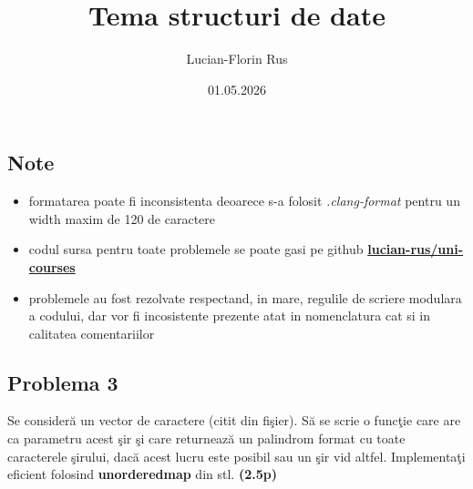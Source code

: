 \documentclass[12pt]{article}
\title{Tema structuri de date}
\author{Lucian-Florin Rus}
\date{01.05.2026}
\begin{document}
\maketitle

\renewcommand{\cftdot}{.}
\tableofcontents 

\subsection{Note}
\begin{itemize}
    \item formatarea poate fi inconsistenta deoarece s-a folosit \textit{.clang-format} pentru un width maxim de 120 de caractere
    \item codul sursa pentru toate problemele se poate gasi pe github \textbf{\hyperlink{https://github.com/lucian-rus/uni-courses/tree/main/sd/tema1}{lucian-rus/uni-courses}}
    \item problemele au fost rezolvate respectand, in mare, regulile de scriere modulara a codului, dar vor fi incosistente prezente atat in nomenclatura cat si in calitatea comentariilor
\end{itemize}

\newpage
\subsection{Problema 3}
Se consideră un vector de caractere (citit din fişier). Să se scrie o funcţie care are ca parametru acest şir şi care returnează un palindrom format cu toate caracterele şirului, dacă acest lucru este posibil sau un şir vid altfel. Implementaţi eficient folosind \textbf{unordered\textunderscore map} din stl.
\textbf{(2.5p)}\newline
\end{document}
